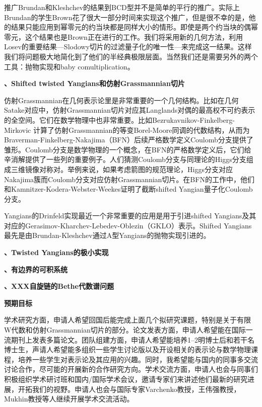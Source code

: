 \documentclass[12pt,UTF8,AutoFakeBold=4,a4paper]{ctexart}
\begin{document}
推广Brundan和Kleshchev的结果到BCD型并不是简单的平行的推广。实际上Brundan的学生Brown花了很大一部分时间来实现这个推广，但是很不幸的是，他的结果只能应用到幂零元的约当块都是同样大小的情形。即使是两个约当块的偶幂零元，这个结果也是Brown正在进行的工作。我们将采用新的几何方法，利用Losev的重要结果---Slodowy切片的过滤量子化的唯一性---来完成这一结果。这样我们将问题极大地简化到了他们的半经典极限层面。当然我们还是需要另外的两个工具：抛物实现和baby comultiplication。

\medskip

\textbf{、Shifted twisted Yangians和仿射Grassmannian切片}

仿射Grassmannian在几何表示论里是非常重要的一个几何结构。比如在几何Satake对应中，仿射Grassmannian切片对应其Langlands对偶的最高权不可约表示的全空间。它们在数学物理中也非常重要。比如Bezrukavnikov-Finkelberg-Mirkovic 计算了仿射Grassmannian的等变Borel-Moore同调的代数结构，从而为Braverman-Finkelberg-Nakajima（BFN）后续严格数学定义Coulomb分支提供了雏形。Coulomb分支是数学物理的一个概念，在BFN的严格数学定义后，它们给辛消解提供了一些列的重要例子。人们猜测Coulomb分支与同理论的Higgs分支组成三维镜像对称对。举例来说，如果考虑箭图的规范理论，Higgs分支对应Nakajima簇而Coulomb分支对应仿射Grassmannian切片。在BFN的工作中，他们和Kamnitzer-Kodera-Webster-Weekes证明了截断shifted Yangian量子化Coulomb分支。

Yangians的Drinfeld实现最近一个非常重要的应用是用于引进shifted Yangians及其对应的Gerasimov-Kharchev-Lebedev-Oblezin（GKLO）表示。Shifted Yangians最先是由Brundan-Kleshchev通过A型Yangians的抛物实现引进的。

\medskip

\textbf{、Twisted Yangians的极小实现}

\medskip

\textbf{、有边界的可积系统}


\medskip

\textbf{、XXX自旋链的Bethe代数谱问题}


\medskip

\textbf{\sihao 预期目标}

学术研究方面，申请人希望回国后能完成上面几个拟研究课题，特别是关于有限W代数和仿射Grassmannian切片的部分。论文发表方面，申请人希望能在国际一流期刊上发表多篇论文。团队组建方面，申请人希望能培养1--2明博士后和若干名博士生，声请人希望能多组织一些学生讨论版以及开设相关的表示论与数学物理课程，培养一些学生对表示论及其应用的兴趣。同时，我希望能与国内的同事多交流讨论合作，尽可能的开展新的合作研究方向。学术交流方面，申请人也会与同事们积极组织学术研讨班和国内/国际学术会议，邀请专家们来讲述他们最新的研究进展，开拓我们的视野。申请人也会与国际专家Varchenko教授，王伟强教授，Mukhin教授等人继续开展学术交流活动。
\end{document}
